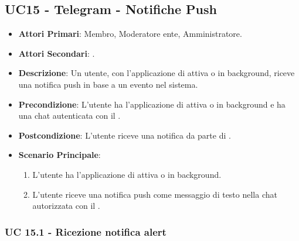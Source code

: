 \subsection{UC15 - Telegram - Notifiche Push}
		
		
	\begin{itemize}
		\item \textbf{Attori Primari}: Membro, Moderatore ente, Amministratore.
		\item \textbf{Attori Secondari}: .
		\item \textbf{Descrizione}: Un utente, con l'applicazione di  attiva o in background, riceve una notifica push in base a un evento nel sistema. 
		\item \textbf{Precondizione}: L'utente ha l'applicazione di  attiva o in background e ha una chat autenticata con il .
		\item \textbf{Postcondizione}: L'utente riceve una notifica da parte di .
		\item \textbf{Scenario Principale}:
		\begin{enumerate}
			\item L'utente ha l'applicazione di  attiva o in background. 
			\item L'utente riceve una notifica push come messaggio di testo nella chat autorizzata con il .
		\end{enumerate}
	\end{itemize}
	
	\subsubsection{UC 15.1 - Ricezione notifica alert}

